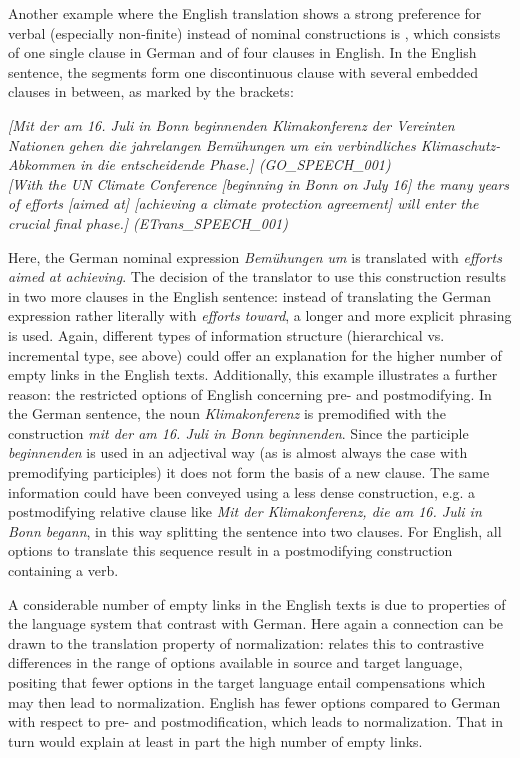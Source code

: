 \documentclass[output=paper]{LSP/langsci}
\begin{document}
Another example where the English translation shows a strong preference for verbal (especially non-finite) instead of nominal constructions is , which consists of one single clause in German and of four clauses in English. In the English sentence, the segments form one discontinuous clause with several embedded clauses in between, as marked by the brackets: 


\ea \label{ex:culo:14}
  \ea \textit{[Mit der am 16. Juli in Bonn beginnenden Klimakonferenz der Vereinten Nationen gehen die jahrelangen Bemühungen um ein verbindliches Klimaschutz-Abkommen in die entscheidende Phase.] \textup{(GO\_SPEECH\_001)}}\\
   \ex \textit{[With the UN Climate Conference [beginning in Bonn on July 16] the many years of efforts [aimed at] [achieving a climate protection agreement] will enter the crucial final phase.] \textup{(ETrans\_SPEECH\_001)}}
   \z
\z

Here, the German nominal expression \textit{Bemühungen um} is translated with \textit{efforts aimed at achieving}. The decision of the translator to use this construction results in two more clauses in the English sentence: instead of translating the German expression rather literally with \textit{efforts toward}, a longer and more explicit phrasing is used. Again, different types of information structure (hierarchical vs. incremental type, see above) could offer an explanation for the higher number of empty links in the English texts. Additionally, this example illustrates a further reason: the restricted options of English concerning pre- and postmodifying. In the German sentence, the noun \textit{Klimakonferenz} is premodified with the construction \textit{mit der am 16. Juli in Bonn beginnenden}. Since the participle \textit{beginnenden} is used in an adjectival way (as is almost always the case with premodifying participles) it does not form the basis of a new clause. The same information could have been conveyed using a less dense construction, e.g. a postmodifying relative clause like \textit{Mit der Klimakonferenz, die am 16. Juli in Bonn begann}, in this way splitting the sentence into two clauses. For English, all options to translate this sequence result in a postmodifying construction containing a verb. 


A considerable number of empty links in the English texts is due to properties of the language system that contrast with German. Here again a connection can be drawn to the translation property of normalization: \citet[218]{Teich2003} relates this to contrastive differences in the range of options available in source and target language, positing that fewer options in the target language entail compensations which may then lead to normalization. English has fewer options compared to German with respect to pre- and postmodification, which leads to normalization. That in turn would explain at least in part the high number of empty links. 
\end{document}
